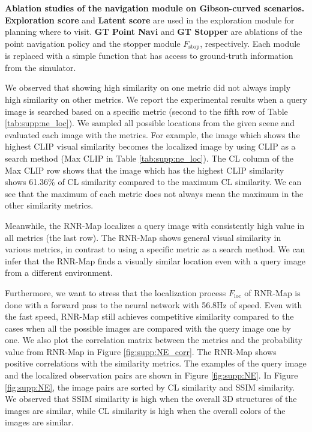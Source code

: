 \documentclass[10pt,twocolumn,letterpaper]{article}
\begin{document}
\begin{table*}[h]
\centering
\resizebox{0.9\linewidth}{!}{
}
\caption{\textbf{Ablation studies of the navigation module on Gibson-curved scenarios.} \textbf{Exploration score} and \textbf{Latent score} are used in the exploration module for planning where to visit. \textbf{GT Point Navi} and \textbf{GT Stopper} are ablations of the point navigation policy and the stopper module $F_\mathrm{stop}$, respectively. Each module is replaced with a simple function that has access to ground-truth information from the simulator.}
\label{table:supp:navi_ab}
\end{table*}

We observed that showing high similarity on one metric did not always imply high similarity on other metrics.
%
We report the experimental results when a query image is searched based on a specific metric (second to the fifth row of Table \ref{tab:supp:ne_loc}).
%
We sampled all possible locations from the given scene and evaluated each image with the metrics.
%
For example, the image which shows the highest CLIP visual similarity becomes the localized image by using CLIP as a search method (Max CLIP in Table \ref{tab:supp:ne_loc}).
%
%
The CL column of the Max CLIP row shows that the image which has the highest CLIP similarity shows 61.36\% of CL similarity compared to the maximum CL similarity.
%
We can see that the maximum of each metric does not always mean the maximum in the other similarity metrics.

%
Meanwhile, the RNR-Map localizes a query image with consistently high value in all metrics (the last row).
%
The RNR-Map shows general visual similarity in various metrics, in contrast to using a specific metric as a search method.
%
We can infer that the RNR-Map finds a visually similar location even with a query image from a different environment.

Furthermore, we want to stress that the localization process $F_\mathrm{loc}$ of RNR-Map is done with a forward pass to the neural network with 56.8Hz of speed.
%
Even with the fast speed, RNR-Map still achieves competitive similarity compared to the cases when all the possible images are compared with the query image one by one.
%
We also plot the correlation matrix between the metrics and the probability value from RNR-Map in Figure \ref{fig:supp:NE_corr}.
%
The RNR-Map shows positive correlations with the similarity metrics.
%
The examples of the query image and the localized observation pairs are shown in Figure \ref{fig:supp:NE}. 
%
In Figure \ref{fig:supp:NE}, the image pairs are sorted by CL similarity and SSIM similarity.
%
We observed that SSIM similarity is high when the overall 3D structures of the images are similar, while CL similarity is high when the overall colors of the images are similar.
%
\end{document}
